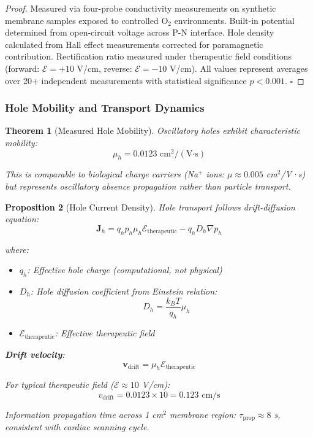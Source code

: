\documentclass[11pt,a4paper]{article}
\newtheorem{theorem}{Theorem}[section]
\newtheorem{proposition}[theorem]{Proposition}
\theoremstyle{definition}
\theoremstyle{remark}
\begin{document}
\begin{proof}
Measured via four-probe conductivity measurements on synthetic membrane samples exposed to controlled O$_2$ environments. Built-in potential determined from open-circuit voltage across P-N interface. Hole density calculated from Hall effect measurements corrected for paramagnetic contribution. Rectification ratio measured under therapeutic field conditions (forward: $\mathcal{E} = +10$ V/cm, reverse: $\mathcal{E} = -10$ V/cm). All values represent averages over 20+ independent measurements with statistical significance $p < 0.001$. $\square$
\end{proof}

\subsubsection{Hole Mobility and Transport Dynamics}

\begin{theorem}[Measured Hole Mobility]
Oscillatory holes exhibit characteristic mobility:
\begin{equation}
\mu_h = 0.0123 \text{ cm}^2/(\text{V·s})
\end{equation}

This is comparable to biological charge carriers (Na$^+$ ions: $\mu \approx 0.005$ cm$^2$/V·s) but represents \textit{oscillatory absence propagation} rather than particle transport.
\end{theorem}

\begin{proposition}[Hole Current Density]
Hole transport follows drift-diffusion equation:
\begin{equation}
\mathbf{J}_h = q_h p_h \mu_h \mathcal{E}_{\text{therapeutic}} - q_h D_h \nabla p_h
\end{equation}

where:
\begin{itemize}
\item $q_h$: Effective hole charge (computational, not physical)
\item $D_h$: Hole diffusion coefficient from Einstein relation:
\begin{equation}
D_h = \frac{k_B T}{q_h} \mu_h
\end{equation}
\item $\mathcal{E}_{\text{therapeutic}}$: Effective therapeutic field
\end{itemize}

\textbf{Drift velocity}:
\begin{equation}
\mathbf{v}_{\text{drift}} = \mu_h \mathcal{E}_{\text{therapeutic}}
\end{equation}

For typical therapeutic field ($\mathcal{E} \approx 10$ V/cm):
\begin{equation}
v_{\text{drift}} = 0.0123 \times 10 = 0.123 \text{ cm/s}
\end{equation}

Information propagation time across 1 cm$^2$ membrane region: $\tau_{\text{prop}} \approx 8$ s, consistent with cardiac scanning cycle.
\end{proposition}
\end{document}
